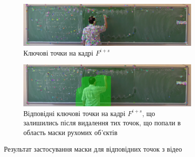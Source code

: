 \begin{figure}[H]
    \centering
    \begin{subfigure}[b]{0.55\textwidth}
        \centering
        \includegraphics[width=\textwidth]{images/next_frame_kp}
        \caption{Ключові точки на кадрі $F^{i+s}$
            \label{fig:yakovlev:keypoints:a}
        }
    \end{subfigure}
    \begin{subfigure}[b]{0.55\textwidth}
        \centering
        \includegraphics[width=\textwidth]{images/next_frame_matches_mask}
        \caption{Відповідні ключові точки на кадрі $F^{i+s}$, що залишились після
            видалення тих точок, що попали в область маски рухомих
            об'єктів
            \label{fig:yakovlev:keypoints:b}
        }
    \end{subfigure}
    \caption{Результат застосування маски для відповідних точок з відео \cite{yakovlev_video}
        \label{fig:yakovlev:keypoints}
    }
\end{figure}
